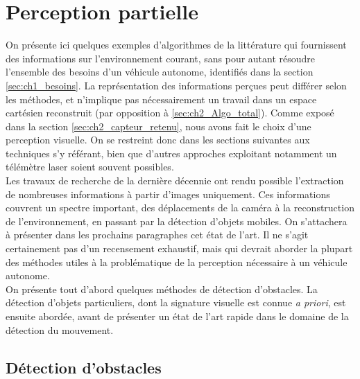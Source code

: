 \section{Perception partielle}\label{sec:ch2_perception_spécifique}
On présente ici quelques exemples d'algorithmes de la littérature qui fournissent des informations sur l'environnement courant, sans pour autant résoudre l'ensemble des besoins d'un véhicule autonome, identifiés dans la section \ref{sec:ch1_besoins}. La représentation des informations perçues peut différer selon les méthodes, et n'implique pas nécessairement un travail dans un espace cartésien reconstruit (par opposition à \ref{sec:ch2_Algo_total}). Comme exposé dans la section \ref{sec:ch2_capteur_retenu}, nous avons fait le choix d'une perception visuelle. On se restreint donc dans les sections suivantes aux techniques s'y référant, bien que d'autres approches exploitant notamment un télémètre laser soient souvent possibles. \\
Les travaux de recherche de la dernière décennie ont rendu possible l'extraction de nombreuses informations à partir d'images uniquement. Ces informations couvrent un spectre important, des déplacements de la caméra à la reconstruction de l'environnement, en passant par la détection d'objets mobiles. On s'attachera à présenter dans les prochains paragraphes cet état de l'art. Il ne s'agit certainement pas d'un recensement exhaustif, mais qui devrait aborder la plupart des méthodes utiles à la problématique de la perception nécessaire à un véhicule autonome.\\
On présente tout d'abord quelques méthodes de détection d'obstacles. La détection d'objets particuliers, dont la signature visuelle est connue \textit{a priori}, est ensuite abordée, avant de présenter un état de l'art rapide dans le domaine de la détection du mouvement. 

\subsection{Détection d'obstacles}
